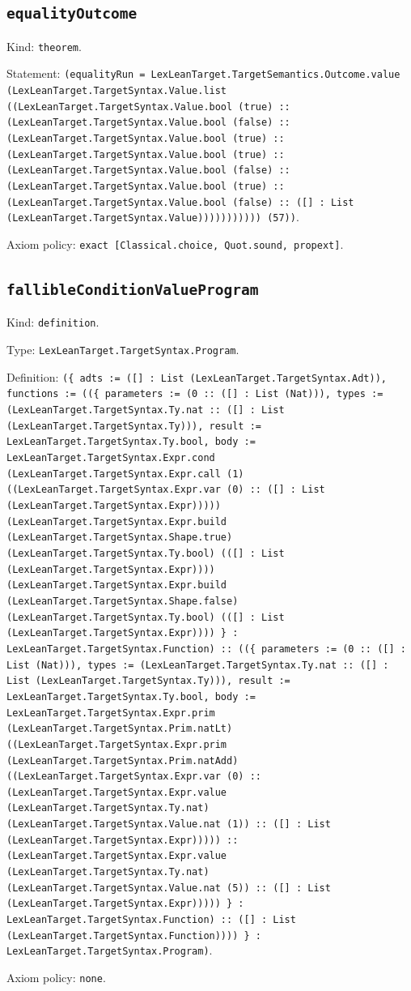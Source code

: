 \documentclass[11pt]{article}
\begin{document}
\subsection*{\texttt{equalityOutcome}}
\noindent Kind: \texttt{theorem}.\par
\noindent Statement: \texttt{(equalityRun = LexLeanTarget.TargetSemantics.Outcome.value (LexLeanTarget.TargetSyntax.Value.list ((LexLeanTarget.TargetSyntax.Value.bool (true) :: (LexLeanTarget.TargetSyntax.Value.bool (false) :: (LexLeanTarget.TargetSyntax.Value.bool (true) :: (LexLeanTarget.TargetSyntax.Value.bool (true) :: (LexLeanTarget.TargetSyntax.Value.bool (false) :: (LexLeanTarget.TargetSyntax.Value.bool (true) :: (LexLeanTarget.TargetSyntax.Value.bool (false) :: ([] : List (LexLeanTarget.TargetSyntax.Value))))))))))) (57))}.\par
\noindent Axiom policy: \texttt{exact [Classical.choice, Quot.sound, propext]}.\par
\subsection*{\texttt{fallibleConditionValueProgram}}
\noindent Kind: \texttt{definition}.\par
\noindent Type: \texttt{LexLeanTarget.TargetSyntax.Program}.\par
\noindent Definition: \texttt{(\{ adts := ([] : List (LexLeanTarget.TargetSyntax.Adt)), functions := ((\{ parameters := (0 :: ([] : List (Nat))), types := (LexLeanTarget.TargetSyntax.Ty.nat :: ([] : List (LexLeanTarget.TargetSyntax.Ty))), result := LexLeanTarget.TargetSyntax.Ty.bool, body := LexLeanTarget.TargetSyntax.Expr.cond (LexLeanTarget.TargetSyntax.Expr.call (1) ((LexLeanTarget.TargetSyntax.Expr.var (0) :: ([] : List (LexLeanTarget.TargetSyntax.Expr))))) (LexLeanTarget.TargetSyntax.Expr.build (LexLeanTarget.TargetSyntax.Shape.true) (LexLeanTarget.TargetSyntax.Ty.bool) (([] : List (LexLeanTarget.TargetSyntax.Expr)))) (LexLeanTarget.TargetSyntax.Expr.build (LexLeanTarget.TargetSyntax.Shape.false) (LexLeanTarget.TargetSyntax.Ty.bool) (([] : List (LexLeanTarget.TargetSyntax.Expr)))) \} : LexLeanTarget.TargetSyntax.Function) :: ((\{ parameters := (0 :: ([] : List (Nat))), types := (LexLeanTarget.TargetSyntax.Ty.nat :: ([] : List (LexLeanTarget.TargetSyntax.Ty))), result := LexLeanTarget.TargetSyntax.Ty.bool, body := LexLeanTarget.TargetSyntax.Expr.prim (LexLeanTarget.TargetSyntax.Prim.natLt) ((LexLeanTarget.TargetSyntax.Expr.prim (LexLeanTarget.TargetSyntax.Prim.natAdd) ((LexLeanTarget.TargetSyntax.Expr.var (0) :: (LexLeanTarget.TargetSyntax.Expr.value (LexLeanTarget.TargetSyntax.Ty.nat) (LexLeanTarget.TargetSyntax.Value.nat (1)) :: ([] : List (LexLeanTarget.TargetSyntax.Expr))))) :: (LexLeanTarget.TargetSyntax.Expr.value (LexLeanTarget.TargetSyntax.Ty.nat) (LexLeanTarget.TargetSyntax.Value.nat (5)) :: ([] : List (LexLeanTarget.TargetSyntax.Expr))))) \} : LexLeanTarget.TargetSyntax.Function) :: ([] : List (LexLeanTarget.TargetSyntax.Function)))) \} : LexLeanTarget.TargetSyntax.Program)}.\par
\noindent Axiom policy: \texttt{none}.\par
\end{document}
